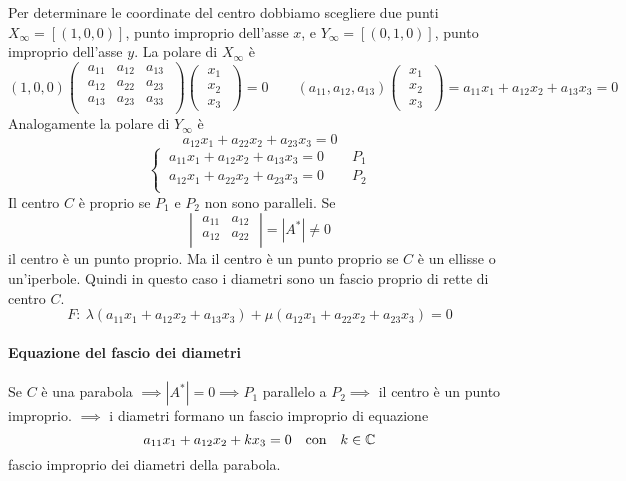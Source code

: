 Per determinare le coordinate del centro dobbiamo scegliere due punti \(X_{\infty} = [(1, 0, 0)]\), punto improprio dell'asse \(x\), e \(Y_{\infty} = [(0,1,0)]\), punto improprio dell'asse \(y\). La polare di \(X_{\infty}\) è \[
    (1,0,0)
\left( \; \begin{matrix}
    a_{11} & a_{12} & a_{13} \\
    a_{12} & a_{22} & a_{23} \\
    a_{13} & a_{23} & a_{33} \\
\end{matrix} \; \right)
\left( \; \begin{matrix} x_1 \\ x_2\\ x_3 \end{matrix} \; \right) = 0 \qquad (a_{11}, a_{12}, a_{13}) \left( \; \begin{matrix} x_1 \\ x_2\\ x_3 \end{matrix} \; \right) = a_{11}x_1+a_{12}x_2 + a_{13} x_3 = 0
\] Analogamente la polare di \(Y_{\infty}\) è  \[
a_{12}x_1 + a_{22}x_2 + a_{23}x_3 = 0
\] \[
\begin{cases}
    \ a_{11}x_1+a_{12}x_2+a_{13}x_3 = 0 \qquad P_1 \\
    \ a_{12}x_1+a_{22}x_2+a_{23}x_3=0 \qquad P_2 \\
\end{cases}
\] 
Il centro \(C\) è proprio se \(P_1\) e \(P_2\) non sono paralleli. Se \[
\left| \; \begin{matrix}
    a_{11} & a_{12} \\
    a_{12} & a_{22} \\
\end{matrix} \; \right| = |A^{*}| \neq 0
\] il centro è un punto proprio. Ma il centro è un punto proprio se \(C\) è un ellisse o un'iperbole. Quindi in questo caso i diametri sono un fascio proprio di rette di centro \(C\). \[
F: \ \lambda (a_{11}x_1+a_{12}x_2+a_{13}x_3) + \mu (a_{12}x_1 + a_{22}x_2 + a_{23}x_3) = 0
\] \paragraph{Equazione del fascio dei diametri} Se \(C\) è una parabola \(\implies |A^{*}| = 0 \implies P_1 \) parallelo a \(P_2 \implies  \) il centro è un punto improprio. \(\implies \) i diametri formano un fascio improprio di equazione \[
a_{11}x_1+a_{12}x_2 + kx_3 = 0 \quad \text{con} \quad k \in \CC
\] fascio improprio dei diametri della parabola.

